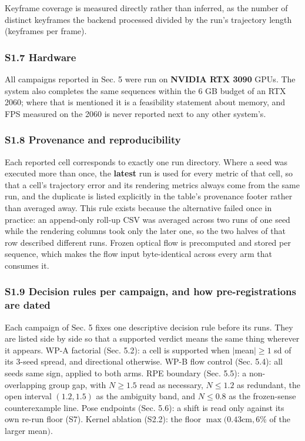 Keyframe coverage is measured directly rather than inferred, as the number of distinct keyframes the backend processed divided by the run's trajectory length (keyframes per frame).


\subsubsection{S1.7 Hardware}


All campaigns reported in Sec. 5 were run on \textbf{NVIDIA RTX 3090} GPUs. The system also completes the same sequences within the 6 GB budget of an RTX 2060; where that is mentioned it is a feasibility statement about memory, and FPS measured on the 2060 is never reported next to any other system's.


\subsubsection{S1.8 Provenance and reproducibility}


Each reported cell corresponds to exactly one run directory. Where a seed was executed more than once, the \textbf{latest} run is used for every metric of that cell, so that a cell's trajectory error and its rendering metrics always come from the same run, and the duplicate is listed explicitly in the table's provenance footer rather than averaged away. This rule exists because the alternative failed once in practice: an append-only roll-up CSV was averaged across two runs of one seed while the rendering columns took only the later one, so the two halves of that row described different runs. Frozen optical flow is precomputed and stored per sequence, which makes the flow input byte-identical across every arm that consumes it.



\subsubsection{S1.9 Decision rules per campaign, and how pre-registrations are dated}

Each campaign of Sec. 5 fixes one descriptive decision rule before its runs. They are listed side by side so that a supported verdict means the same thing wherever it appears. WP-A factorial (Sec. 5.2): a cell is supported when $|$mean$| \ge 1$ sd of its 3-seed spread, and directional otherwise. WP-B flow control (Sec. 5.4): all seeds same sign, applied to both arms. RPE boundary (Sec. 5.5): a non-overlapping group gap, with $N \ge 1.5$ read as necessary, $N \le 1.2$ as redundant, the open interval $(1.2, 1.5)$ as the ambiguity band, and $N \le 0.8$ as the frozen-sense counterexample line. Pose endpoints (Sec. 5.6): a shift is read only against its own re-run floor (S7). Kernel ablation (S2.2): the floor $\max(0.43 \mathrm{cm}, 6\%$ of the larger mean$)$.

